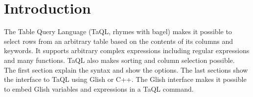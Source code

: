 

\section{Introduction}
The Table Query Language (TaQL, rhymes with bagel) makes
it possible to select
rows from an arbitrary table based on the contents of its
columns and keywords. It supports arbitrary complex
expressions including regular expressions and many functions.
TaQL also makes sorting and column selection possible.
\\
The first section explain the syntax and show the options.
The last sections show the interface to TaQL using Glish or C++.
The Glish interface makes it possible to embed Glish
variables and expressions in a TaQL command.


